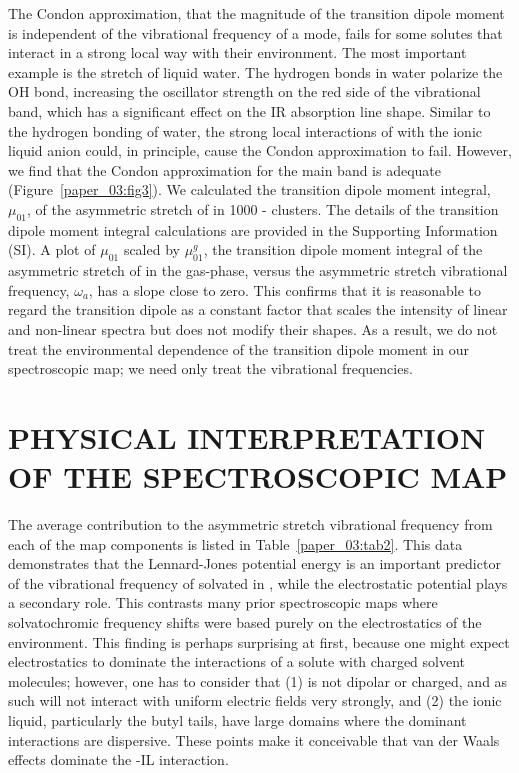 \documentclass[%
  class = book,%
  crop = false,%
  float = true,%
  multi = true,%
  preview = false,%
]{standalone}
\newcommand{\caps}[1]{\uppercase{#1}}
\begin{document}
The Condon approximation, that the magnitude of the transition dipole moment is independent of the vibrational frequency of a mode, fails for some solutes that interact in a strong local way with their environment. The most important example is the  stretch of liquid water. The hydrogen bonds in water polarize the OH bond, increasing the oscillator strength on the red side of the vibrational band, which has a significant effect on the IR absorption line shape.\cite{corcelliJPCA-05,schmidt_pronounced_2005-1,loparoCP-07} Similar to the hydrogen bonding of water, the strong local interactions of  with the ionic liquid anion could, in principle, cause the Condon approximation to fail. However, we find that the Condon approximation for the main band is adequate (Figure~\ref{paper_03:fig3}). We calculated the transition dipole moment integral, \(\mu_{01}\), of the asymmetric stretch of  in \num{1000} -\ce{[C4C1im][PF6]} clusters. The details of the transition dipole moment integral calculations are provided in the Supporting Information (SI). A plot of \(\mu_{01}\) scaled by \(\mu_{01}^{g}\), the transition dipole moment integral of the asymmetric stretch of  in the gas-phase, versus the asymmetric stretch vibrational frequency, \(\omega_{a}\), has a slope close to zero. This confirms that it is reasonable to regard the transition dipole as a constant factor that scales the intensity of linear and non-linear spectra but does not modify their shapes. As a result, we do not treat the environmental dependence of the transition dipole moment in our spectroscopic map; we need only treat the vibrational frequencies.

\section{\texorpdfstring{\caps{Physical Interpretation of the Spectroscopic Map}}{Physical Interpretation of the Spectroscopic Map}}
\label{paper_03:sec:IV}

The average contribution to the  asymmetric stretch vibrational frequency from each of the map components is listed in Table~\ref{paper_03:tab2}. This data demonstrates that the Lennard-Jones potential energy is an important predictor of the vibrational frequency of  solvated in \ce{[C4C1im][PF6]}, while the electrostatic potential plays a secondary role. This contrasts many prior spectroscopic maps where solvatochromic frequency shifts were based purely on the electrostatics of the environment.\cite{lin_water_2009-1,ohJCP-08,Miller2009} This finding is perhaps surprising at first, because one might expect electrostatics to dominate the interactions of a solute with charged solvent molecules; however, one has to consider that (1)  is not dipolar or charged, and as such will not interact with uniform electric fields very strongly, and (2) the ionic liquid, particularly the \ce{[C4C1im]+} butyl tails, have large domains where the dominant interactions are dispersive. These points make it conceivable that van der Waals effects dominate the -IL interaction.
\end{document}
